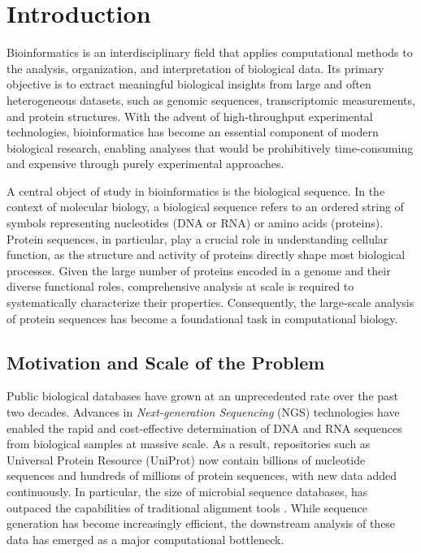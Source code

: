 \section*{Introduction}

Bioinformatics is an interdisciplinary field that applies computational
methods to the analysis, organization, and interpretation of biological data.
Its primary objective is to extract meaningful biological insights from large
and often heterogeneous datasets, such as genomic sequences, transcriptomic
measurements, and protein structures. With the advent of high-throughput
experimental technologies, bioinformatics has become an essential component of
modern biological research, enabling analyses that would be prohibitively
time-consuming and expensive through purely experimental approaches.

A central object of study in bioinformatics is the biological sequence. In the
context of molecular biology, a biological sequence refers to an ordered string
of symbols representing nucleotides (DNA or RNA) or amino acids (proteins).
Protein sequences, in particular, play a crucial role in understanding cellular
function, as the structure and activity of proteins directly shape most
biological processes. Given the large number of proteins encoded in a genome and
their diverse functional roles, comprehensive analysis at scale is required to
systematically characterize their properties. Consequently, the large-scale
analysis of protein sequences has become a foundational task in computational
biology.

\subsection*{Motivation and Scale of the Problem}

Public biological databases have grown at an unprecedented rate over the past
two decades. Advances in \textit{Next-generation Sequencing} (NGS) technologies
have enabled the rapid and cost-effective determination of DNA and RNA
sequences from biological samples at massive scale. As a result, repositories
such as Universal Protein Resource (UniProt) \cite{uniprot} now contain
billions of nucleotide sequences and hundreds of millions of protein sequences,
with new data added continuously. In particular, the size of microbial sequence
databases, has outpaced the capabilities of traditional alignment tools
\cite{lexicmap}. While sequence generation has become increasingly efficient,
the downstream analysis of these data has emerged as a major computational
bottleneck.

